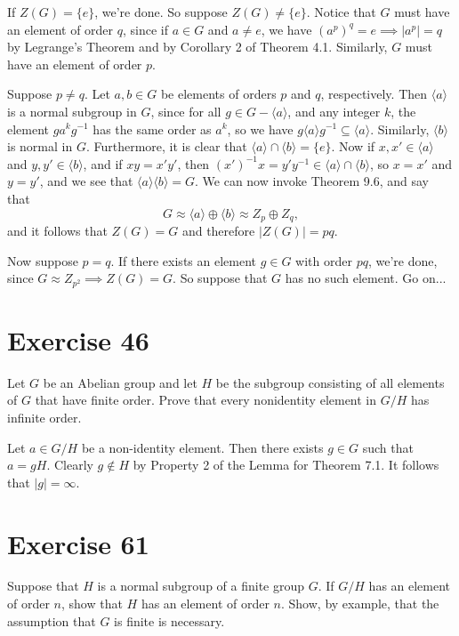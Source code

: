 \documentclass[12pt]{article}
\begin{document}
If $Z(G)=\{e\}$, we're done.  So suppose $Z(G)\neq\{e\}$.
Notice that $G$ must have an element of order $q$, since
if $a\in G$ and $a\neq e$, we have $(a^p)^q=e\implies |a^p|=q$
by Legrange's Theorem and by Corollary 2 of Theorem 4.1.
Similarly, $G$ must have an element of order $p$.

Suppose $p\neq q$.  Let $a,b\in G$ be elements of orders $p$ and $q$, respectively.
Then $\langle a\rangle$ is a normal subgroup
in $G$, since for all $g\in G-\langle a\rangle$, and any integer $k$, the element
$ga^kg^{-1}$ has the same order as $a^k$, so we have
$g\langle a\rangle g^{-1}\subseteq \langle a\rangle$.
Similarly, $\langle b\rangle$ is normal in $G$.
Furthermore, it is clear that $\langle a\rangle\cap\langle b\rangle=\{e\}$.
Now if $x,x'\in\langle a\rangle$ and $y,y'\in\langle b\rangle$, and
if $xy=x'y'$, then $(x')^{-1}x=y'y^{-1}\in\langle a\rangle\cap\langle b\rangle$,
so $x=x'$ and $y=y'$, and we see that $\langle a\rangle\langle b\rangle=G$.
We can now invoke Theorem 9.6, and say that
\begin{equation*}
G\approx\langle a\rangle\oplus\langle b\rangle\approx Z_p\oplus Z_q,
\end{equation*}
and it follows that $Z(G)=G$ and therefore $|Z(G)|=pq$.

Now suppose $p=q$.  If there exists an element $g\in G$
with order $pq$, we're done, since $G\approx Z_{p^2}\implies Z(G)=G$.
So suppose that $G$ has no such element.  Go on...

\section*{Exercise 46}

Let $G$ be an Abelian group and let $H$ be the subgroup consisting
of all elements of $G$ that have finite order.  Prove that every nonidentity
element in $G/H$ has infinite order.

Let $a\in G/H$ be a non-identity element.  Then there exists $g\in G$ such
that $a=gH$.  Clearly $g\not\in H$ by Property 2 of the Lemma for Theorem 7.1.
It follows that $|g|=\infty$.

\section*{Exercise 61}

Suppose that $H$ is a normal subgroup of a finite group $G$.
If $G/H$ has an element of order $n$, show that $H$ has an element of order $n$.
Show, by example, that the assumption that $G$ is finite is necessary.
\end{document}
